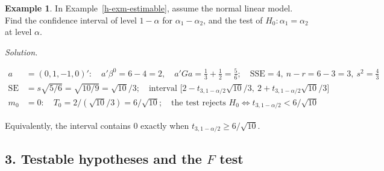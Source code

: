 \documentclass[12pt]{article}
\DeclareMathOperator{\rank}{rank}
\theoremstyle{definition}
\newtheorem{example}[theorem]{Example}
\newcommand{\boardtop}{\vspace*{-\abovedisplayskip}}
\DeclareMathOperator{\SE}{SE}
\begin{document}
\begin{example}\label{h-exm-t}
In Example~\ref{h-exm-estimable}, assume the normal linear model. Find the confidence interval of level \(1-\alpha\) for
\(\alpha_1-\alpha_2\), and the test of \(H_0\colon\alpha_1=\alpha_2\) at level \(\alpha\).
\end{example}
\textit{Solution.}
\begin{board}[\(\alpha_1-\alpha_2\) is estimable (Example~\ref{h-exm-estimable}); \(\beta^0\), \(a'Ga\) as in
Example~\ref{h-exm-solution}; \(\mathrm{SSE}=4\) (\lec{11}, \lit{Example~11}), \(r=\rank X=3\) (\lec{11}, \lit{Theorem~6}(b));
Theorem~\ref{h-thm-t}(b):]
\boardtop
\begin{align*}
a&=(0,1,-1,0)':\quad a'\beta^0=6-4=2,\quad a'Ga=\tfrac13+\tfrac12=\tfrac56;\quad\mathrm{SSE}=4,\ n-r=6-3=3,\ s^2=\tfrac43\\
\SE&=s\sqrt{5/6}=\sqrt{10/9}=\sqrt{10}/3;\quad\text{interval }\bigl[2-t_{3,1-\alpha/2}\sqrt{10}/3,\ 2+t_{3,1-\alpha/2}\sqrt{10}/3\bigr]\\
m_0&=0:\quad T_0=2/(\sqrt{10}/3)=6/\sqrt{10};\quad\text{the test rejects }H_0\iff t_{3,1-\alpha/2}<6/\sqrt{10}
\end{align*}
\end{board}
Equivalently, the interval contains \(0\) exactly when \(t_{3,1-\alpha/2}\geqslant6/\sqrt{10}\).

\subsection*{3. Testable hypotheses and the \(F\) test}
\end{document}
